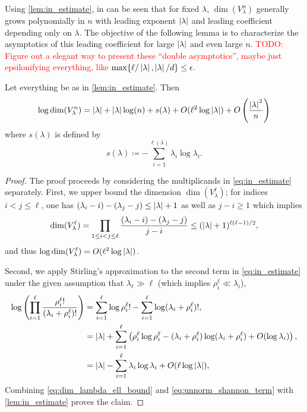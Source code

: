 \documentclass[notitlepage, 10pt]{article}
\begin{document}
Using \cref{lem:in_estimate}, in can be seen that for fixed $\lambda$, $\dim(V_{\lambda}^{n})$ generally grows polynomially in $n$ with leading exponent $\left|\lambda\right|$ and leading coefficient depending only on $\lambda$.
The objective of the following lemma is to characterize the asymptotics of this leading coefficient for large $\left|\lambda\right|$ and even large $n$.
\textcolor{red}{TODO: Figure out a elegant way to present these ``double asymptotics'', maybe just epsilonifying everything, like $\max\{\ell/\left|\lambda\right|, \left|\lambda\right|/d\} \leq \epsilon$.}
\begin{lem}
    \label{lem:double_asymptotics}
    Let everything be as in \cref{lem:in_estimate}. Then
    \begin{equation}
        \log \dim (V_{\lambda}^{n}) = \left|\lambda\right| + \left|\lambda\right|\log(n) + s(\lambda) + O(\ell^2 \log \left|\lambda\right|) + O\left(\frac{\left|\lambda\right|^2}{n}\right)
    \end{equation}
    where $s(\lambda)$ is defined by
    \begin{equation}
        \label{eq:unnorm_shannon}
        s(\lambda) \coloneqq -\sum_{i=1}^{\ell(\lambda)} \lambda_i \log \lambda_i.
    \end{equation}
\end{lem}
\begin{proof}
    The proof proceeds by considering the multiplicands in \cref{eq:in_estimate} separately.
    First, we upper bound the dimension $\dim(V_{\lambda}^{\ell})$; for indices $i<j\leq \ell$, one has $(\lambda_i-i)-(\lambda_j-j) \leq \left|\lambda\right| + 1$ as well as $j-i \geq 1$ which implies
    \begin{equation}
        \label{eq:dim_lambda_ell_bound}
        \dim(V_{\lambda}^{\ell}) = \prod_{1 \leq i<j\leq \ell} \frac{(\lambda_i-i)-(\lambda_j-j)}{j-i} \leq (\left|\lambda\right|+1)^{\ell(\ell-1)/2},
    \end{equation}
    and thus $\log \dim(V_{\lambda}^{\ell}) = O(\ell^2 \log \left|\lambda\right|)$.

    Second, we apply Stirling's approximation \cite{robbins1955remark} to the second term in \cref{eq:in_estimate} under the given assumption that $\lambda_{\ell} \gg \ell$ (which implies $\rho^{\ell}_{i} \ll \lambda_{i}$),
    \begin{align}
        \log\left(\prod_{i=1}^{\ell}\frac{\rho^{\ell}_{i}!}{(\lambda_i + \rho^{\ell}_{i}) !}\right) 
        &= \sum_{i=1}^{\ell}\log \rho^{\ell}_i! - \sum_{i=1}^{\ell} \log (\lambda_i + \rho^{\ell}_i)!, \\
        &= \left|\lambda\right| + \sum_{i=1}^{\ell} \left(\rho^{\ell}_i\log \rho^{\ell}_i - (\lambda_i + \rho^{\ell}_i)\log (\lambda_i + \rho^{\ell}_i)+ O(\log \lambda_i )\right), \\
        &= \left|\lambda\right| - \sum_{i=1}^{\ell} \lambda_i\log \lambda_i + O( \ell \log \left|\lambda\right| ), \\
        \label{eq:unnorm_shannon_term}
    \end{align}
    Combining \cref{eq:dim_lambda_ell_bound} and \cref{eq:unnorm_shannon_term} with \cref{lem:in_estimate} proves the claim.
\end{proof}
\end{document}
